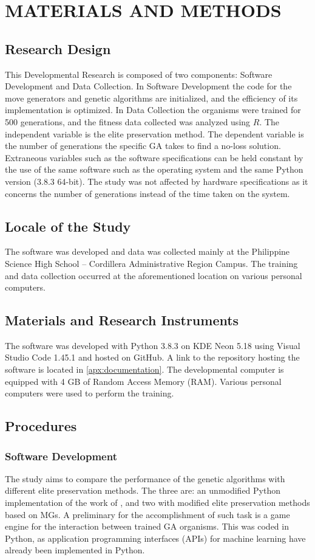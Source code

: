 \documentclass{strrespaper-trad}
\begin{document}
	\chapter{MATERIALS AND METHODS}
		\section{Research Design}
			This Developmental Research is composed of two components: Software Development and Data Collection.
			In Software Development the code for the move generators and genetic algorithms are initialized, and the efficiency of its implementation is optimized.
			In Data Collection the organisms were trained for 500 generations, and the fitness data collected was analyzed using $R$.
			The independent variable is the elite preservation method.
			The dependent variable is the number of generations the specific GA takes to find a no-loss solution.
			Extraneous variables such as the software specifications can be held constant by the use of the same software such as the operating system and the same Python version (3.8.3 64-bit).
			The study was not affected by hardware specifications as it concerns the number of generations instead of the time taken on the system.

		\section{Locale of the Study}
			The software was developed and data was collected mainly at the Philippine Science High School -- Cordillera Administrative Region Campus.
			The training and data collection occurred at the aforementioned location on various personal computers.

		\section{Materials and Research Instruments}
			The software was developed with Python 3.8.3 on KDE Neon 5.18 using Visual Studio Code 1.45.1 and hosted on GitHub.
			A link to the repository hosting the software is located in \ref{apx:documentation}.
			The developmental computer is equipped with 4 GB of Random Access Memory (RAM).
			Various personal computers were used to perform the training.

		\section{Procedures}
			\subsection{Software Development}
				The study aims to compare the performance of the genetic algorithms with different elite preservation methods.
				The three are: an unmodified Python implementation of the work of \textcite{bhattSearchNolossStrategies2008}, and two with modified elite preservation methods based on MGs.
				A preliminary for the accomplishment of such task is a game engine for the interaction between trained GA organisms.
				This was coded in Python, as application programming interfaces (APIs) for machine learning have already been implemented in Python.
\end{document}
